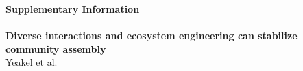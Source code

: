 \documentclass[onecolumn,preprintnumbers,amsmath,amssymb,superscriptaddress]{revtex4-1}
\newcommand{\beginsupplement}{%
        \clearpage
        \setcounter{table}{0}
        \renewcommand{\tablename}{Supplementary Table}%
        \setcounter{figure}{0}
        \renewcommand{\figurename}{Supplementary Figure}%
     }
\begin{document}
\beginsupplement

\begin{bibunit}


% 


\noindent \textbf{Supplementary Information\\ \\
Diverse interactions and ecosystem engineering can stabilize community assembly}\\

\noindent Yeakel et al.

\clearpage


\end{bibunit}
\end{document}
